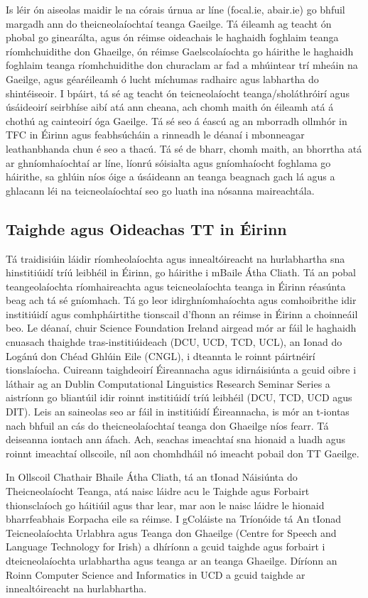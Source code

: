 \begin{multicols}{2}
Is léir ón aiseolas maidir le na córais úrnua ar líne (focal.ie, abair.ie) go bhfuil margadh ann do theicneolaíochtaí teanga Gaeilge. Tá éileamh ag teacht ón phobal go ginearálta, agus ón réimse oideachais le haghaidh foghlaim teanga ríomhchuidithe don Ghaeilge, ón réimse Gaelscolaíochta go háirithe le haghaidh foghlaim teanga ríomhchuidithe don churaclam ar fad a mhúintear trí mheáin na Gaeilge, agus géaréileamh ó lucht míchumas radhairc agus labhartha do shintéiseoir. I bpáirt, tá sé ag teacht ón teicneolaíocht teanga/sholáthróirí agus úsáideoirí seirbhíse aibí atá ann cheana, ach chomh maith ón éileamh atá á chothú ag cainteoirí óga Gaeilge. Tá sé seo á éascú ag an mborradh ollmhór in TFC in Éirinn agus feabhsúcháin a rinneadh le déanaí i mbonneagar leathanbhanda chun é seo a thacú. Tá sé de bharr, chomh maith, an bhorrtha atá ar ghníomhaíochtaí ar líne, líonrú sóisialta agus gníomhaíocht foghlama go háirithe, sa ghlúin níos óige a úsáideann an teanga beagnach gach lá agus a ghlacann léi na teicneolaíochtaí seo go luath ina nósanna maireachtála.


\subsection{Taighde agus Oideachas TT in Éirinn}

Tá traidisiúin láidir ríomheolaíochta agus innealtóireacht na hurlabhartha sna hinstitiúidí tríú leibhéil in Éirinn, go háirithe i mBaile Átha Cliath. Tá an pobal teangeolaíochta ríomhaireachta agus teicneolaíochta teanga in Éirinn réasúnta beag ach tá sé gníomhach. Tá go leor idirghníomhaíochta agus comhoibrithe idir institiúidí agus comhpháirtithe tionscail d'fhonn an réimse in Éirinn a choinneáil beo. Le déanaí, chuir Science Foundation Ireland airgead mór ar fáil le haghaidh cnuasach thaighde tras-institiúideach (DCU, UCD, TCD, UCL), an Ionad do Logánú don Chéad Ghlúin Eile (CNGL), i  dteannta le roinnt páirtnéirí tionslaíocha. Cuireann taighdeoirí Éireannacha agus idirnáisiúnta a gcuid oibre i láthair ag an Dublin Computational Linguistics Research Seminar Series a aistríonn go bliantúil idir roinnt institiúidí tríú leibhéil (DCU, TCD, UCD agus DIT). Leis an saineolas seo ar fáil in institiúidí Éireannacha, is mór an t-iontas nach bhfuil an cás do theicneolaíochtaí teanga don Ghaeilge níos fearr. Tá deiseanna iontach ann áfach. Ach, seachas imeachtaí sna hionaid a luadh agus roinnt imeachtaí ollscoile, níl aon chomhdháil nó imeacht pobail don TT Gaeilge.

In Ollscoil Chathair Bhaile Átha Cliath, tá an tIonad Náisiúnta do Theicneolaíocht Teanga, atá naisc láidre acu le Taighde agus Forbairt thionsclaíoch go háitiúil agus thar lear, mar aon le naisc láidre le hionaid bharrfeabhais Eorpacha eile sa réimse. I gColáiste na Tríonóide tá An tIonad Teicneolaíochta Urlabhra agus Teanga don Ghaeilge (Centre for Speech and Language Technology for Irish) a dhíríonn a gcuid taighde agus forbairt i dteicneolaíochta urlabhartha agus teanga ar an teanga Ghaeilge. Díríonn an Roinn Computer Science and Informatics in UCD a gcuid taighde ar innealtóireacht na hurlabhartha.


\end{multicols}
